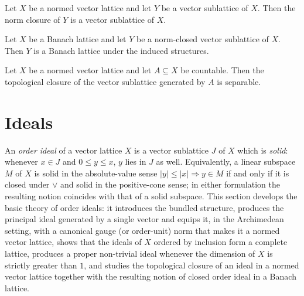 \begin{lemma}
\label{lem:vectorSublattice-topologicalClosure}
\leanok
{}
Let $X$ be a normed vector lattice and let $Y$ be a vector sublattice of
$X$. Then the norm closure of $Y$ is a vector sublattice of $X$.
\end{lemma}

\begin{lemma}
\label{lem:vectorSublattice-instBanachLatticeSubtype}
\leanok
{}
Let $X$ be a Banach lattice and let $Y$ be a norm-closed vector
sublattice of $X$. Then $Y$ is a Banach lattice under the induced structures.
\end{lemma}

\begin{theorem}
\label{thm:vectorSublattice-separableSpace-topologicalClosure-generated-of-countable}
\leanok
{}
Let $X$ be a normed vector lattice and let $A \subseteq X$ be countable.
Then the topological closure of the vector sublattice generated by $A$
is separable.
\end{theorem}

\section{Ideals}

An \emph{order ideal} of a vector lattice $X$ is a vector sublattice
$J$ of $X$ which is \emph{solid}: whenever $x \in J$ and $0 \le y \le
x$, $y$ lies in $J$ as well. Equivalently, a linear subspace $M$ of
$X$ is solid in the absolute-value sense
$\lvert y \rvert \le \lvert x \rvert \Rightarrow y \in M$ if and only
if it is closed under $\vee$ and solid in the positive-cone sense;
in either formulation the resulting notion coincides with that of a
solid subspace. This section develops the basic theory of order
ideals: it introduces the bundled structure, produces the principal
ideal generated by a single vector and equips it, in the Archimedean
setting, with a canonical gauge (or order-unit) norm that makes it a
normed vector lattice, shows that the ideals of $X$ ordered by
inclusion form a complete lattice, produces a proper non-trivial
ideal whenever the dimension of $X$ is strictly greater than $1$, and studies
the topological closure of an ideal in a normed vector lattice
together with the resulting notion of closed order ideal in a
Banach lattice.

